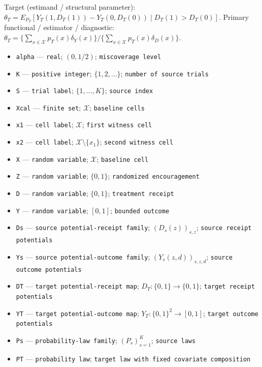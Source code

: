 \documentclass{article}
\begin{document}
Target (estimand / structural parameter): \(\theta_T=E_{P_T}[Y_T(1,D_T(1))-Y_T(0,D_T(0))\mid D_T(1)>D_T(0)]\).
Primary functional / estimator / diagnostic: \(\theta_T=\{\sum_{x\in\mathcal X}p_T(x)\delta_Y(x)\}/\{\sum_{x\in\mathcal X}p_T(x)\delta_D(x)\}\).
\begin{itemize}
  \item \texttt{alpha} --- \texttt{real}; \((0,1/2)\); \texttt{miscoverage level}
  \item \texttt{K} --- \texttt{positive integer}; \(\{1,2,\ldots\}\); \texttt{number of source trials}
  \item \texttt{S} --- \texttt{trial label}; \(\{1,\ldots,K\}\); \texttt{source index}
  \item \texttt{Xcal} --- \texttt{finite set}; \(\mathcal X\); \texttt{baseline cells}
  \item \texttt{x1} --- \texttt{cell label}; \(\mathcal X\); \texttt{first witness cell}
  \item \texttt{x2} --- \texttt{cell label}; \(\mathcal X\setminus\{x_1\}\); \texttt{second witness cell}
  \item \texttt{X} --- \texttt{random variable}; \(\mathcal X\); \texttt{baseline cell}
  \item \texttt{Z} --- \texttt{random variable}; \(\{0,1\}\); \texttt{randomized encouragement}
  \item \texttt{D} --- \texttt{random variable}; \(\{0,1\}\); \texttt{treatment receipt}
  \item \texttt{Y} --- \texttt{random variable}; \([0,1]\); \texttt{bounded outcome}
  \item \texttt{Ds} --- \texttt{source potential-\allowbreak{}receipt family}; \((D_s(z))_{s,z}\); \texttt{source receipt potentials}
  \item \texttt{Ys} --- \texttt{source potential-\allowbreak{}outcome family}; \((Y_s(z,d))_{s,z,d}\); \texttt{source outcome potentials}
  \item \texttt{DT} --- \texttt{target potential-\allowbreak{}receipt map}; \(D_T:\{0,1\}\to\{0,1\}\); \texttt{target receipt potentials}
  \item \texttt{YT} --- \texttt{target potential-\allowbreak{}outcome map}; \(Y_T:\{0,1\}^2\to[0,1]\); \texttt{target outcome potentials}
  \item \texttt{Ps} --- \texttt{probability-\allowbreak{}law family}; \((P_s)_{s=1}^K\); \texttt{source laws}
  \item \texttt{PT} --- \texttt{probability law}; \texttt{target law with fixed covariate composition}

\end{itemize}
\end{document}
